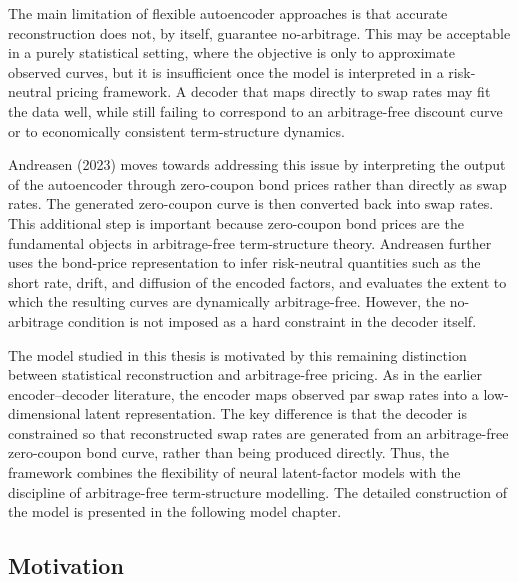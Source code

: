 The main limitation of flexible autoencoder approaches is that accurate reconstruction does not, by itself, guarantee no-arbitrage. This may be acceptable in a purely statistical setting, where the objective is only to approximate observed curves, but it is insufficient once the model is interpreted in a risk-neutral pricing framework. A decoder that maps directly to swap rates may fit the data well, while still failing to correspond to an arbitrage-free discount curve or to economically consistent term-structure dynamics.

Andreasen (2023) moves towards addressing this issue by interpreting the output of the autoencoder through zero-coupon bond prices rather than directly as swap rates. The generated zero-coupon curve is then converted back into swap rates. This additional step is important because zero-coupon bond prices are the fundamental objects in arbitrage-free term-structure theory. Andreasen further uses the bond-price representation to infer risk-neutral quantities such as the short rate, drift, and diffusion of the encoded factors, and evaluates the extent to which the resulting curves are dynamically arbitrage-free. However, the no-arbitrage condition is not imposed as a hard constraint in the decoder itself.

The model studied in this thesis is motivated by this remaining distinction between statistical reconstruction and arbitrage-free pricing. As in the earlier encoder--decoder literature, the encoder maps observed par swap rates into a low-dimensional latent representation. The key difference is that the decoder is constrained so that reconstructed swap rates are generated from an arbitrage-free zero-coupon bond curve, rather than being produced directly. Thus, the framework combines the flexibility of neural latent-factor models with the discipline of arbitrage-free term-structure modelling. The detailed construction of the model is presented in the following model chapter.






\subsection{Motivation}

